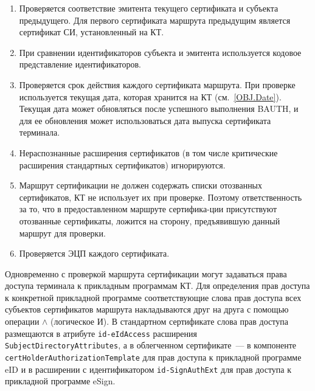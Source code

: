 \begin{enumerate}
\item
Проверяется соответствие эмитента текущего сертификата и субъекта 
предыдущего. Для первого сертификата маршрута предыдущим является 
сертификат СИ, установленный на КТ. 

\item
При сравнении идентификаторов субъекта и эмитента используется кодовое 
представление идентификаторов. 

\item
Проверяется срок действия каждого сертификата маршрута. При проверке 
используется текущая дата, которая хранится на КТ (см.~\ref{OBJ.Date}). 
Текущая дата может обновляться после успешного выполнения BAUTH, и для ее 
обновления может использоваться дата выпуска сертификата терминала. 

\item
Нераспознанные расширения сертификатов (в том числе критические 
расширения стандартных сертификатов) игнорируются. 

\item
Маршрут сертификации не должен содержать списки отозванных сертификатов, 
КТ не использует их при проверке. Поэтому ответственность за то, что в 
предоставленном маршруте сертифика-ции присутствуют отозванные 
сертификаты, ложится на сторону, предъявившую данный маршрут для проверки. 

\item
Проверяется ЭЦП каждого сертификата.
\end{enumerate}

Одновременно с проверкой маршрута сертификации могут задаваться права 
доступа терминала к прикладным программам КТ.
Для определения прав доступа к конкретной 
прикладной программе соответствующие слова прав доступа 
всех субъектов сертификатов маршрута накладываются друг на 
друга с помощью операции $\wedge$ (логическое И). 
В стандартном сертификате слова прав доступа размещаются в 
атрибуте \verb|id-eIdAccess| расширения \verb|SubjectDirectoryAttributes|, 
а в облегченном сертификате~--- в компоненте 
\verb|certHolderAuthorizationTemplate| для прав доступа к прикладной
программе eID и в расширении с идентификатором
\verb|id-SignAuthExt| для прав доступа к прикладной
программе eSign.




